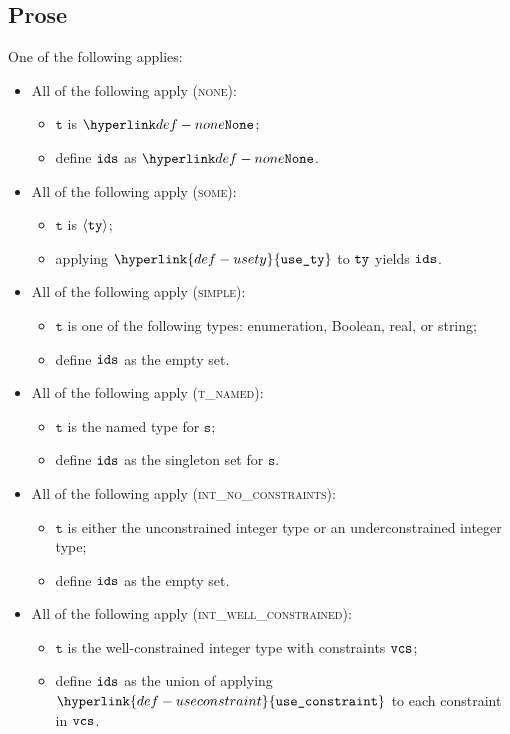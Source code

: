 \documentclass{book}
\newcommand\usety[0]{\hyperlink{def-usety}{\texttt{use\_ty}}}
\newcommand\useconstraint[0]{\hyperlink{def-useconstraint}{\texttt{use\_constraint}}}
\newcommand\vt[0]{\texttt{t}}
\newcommand\vs[0]{\texttt{s}}
\begin{document}
\subsection{Prose}
One of the following applies:
\begin{itemize}
  \item All of the following apply (\textsc{none}):
  \begin{itemize}
    \item $\vt$ is $\None$;
    \item define $\texttt{ids}$ as $\None$.
  \end{itemize}

  \item All of the following apply (\textsc{some}):
  \begin{itemize}
    \item $\vt$ is $\langle\texttt{ty}\rangle$;
    \item applying $\usety$ to $\texttt{ty}$ yields $\texttt{ids}$.
  \end{itemize}

  \item All of the following apply (\textsc{simple}):
  \begin{itemize}
    \item $\vt$ is one of the following types: enumeration, Boolean, real, or string;
    \item define $\texttt{ids}$ as the empty set.
  \end{itemize}

  \item All of the following apply (\textsc{t\_named}):
  \begin{itemize}
    \item $\vt$ is the named type for $\vs$;
    \item define $\texttt{ids}$ as the singleton set for $\vs$.
  \end{itemize}

  \item All of the following apply (\textsc{int\_no\_constraints}):
  \begin{itemize}
    \item $\vt$ is either the unconstrained integer type or an underconstrained integer type;
    \item define $\texttt{ids}$ as the empty set.
  \end{itemize}

  \item All of the following apply (\textsc{int\_well\_constrained}):
  \begin{itemize}
    \item $\vt$ is the well-constrained integer type with constraints $\texttt{vcs}$;
    \item define $\texttt{ids}$ as the union of applying $\useconstraint$ to each constraint in $\texttt{vcs}$.
  \end{itemize}


\end{itemize}
\end{document}
